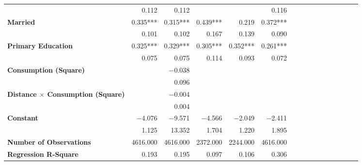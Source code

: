 \begin{tabular}{@{\extracolsep{5pt}}lrrrrrrrrrrrrrrr}
{\bf } & 0.112\phantom{\phantom{)}***} & 0.112\phantom{\phantom{)}***} & \phantom{***} & \phantom{***} & 0.116\phantom{\phantom{)}***} \\
{\bf Married} & 0.335\phantom{)}*** & 0.315\phantom{)}*** & 0.439\phantom{)}*** & 0.219\phantom{\phantom{)}***} & 0.372\phantom{)}*** \\
{\bf } & 0.101\phantom{\phantom{)}***} & 0.102\phantom{\phantom{)}***} & 0.167\phantom{\phantom{)}***} & 0.139\phantom{\phantom{)}***} & 0.090\phantom{\phantom{)}***} \\
{\bf Primary Education} & 0.325\phantom{)}*** & 0.329\phantom{)}*** & 0.305\phantom{)}*** & 0.352\phantom{)}*** & 0.261\phantom{)}*** \\
{\bf } & 0.075\phantom{\phantom{)}***} & 0.075\phantom{\phantom{)}***} & 0.114\phantom{\phantom{)}***} & 0.093\phantom{\phantom{)}***} & 0.072\phantom{\phantom{)}***} \\
{\bf Consumption (Square)} & \phantom{***} & $-$0.038\phantom{\phantom{)}***} & \phantom{***} & \phantom{***} & \phantom{***} \\
{\bf } & \phantom{***} & 0.096\phantom{\phantom{)}***} & \phantom{***} & \phantom{***} & \phantom{***} \\
{\bf Distance $\times$ Consumption (Square)} & \phantom{***} & $-$0.004\phantom{\phantom{)}***} & \phantom{***} & \phantom{***} & \phantom{***} \\
{\bf } & \phantom{***} & 0.004\phantom{\phantom{)}***} & \phantom{***} & \phantom{***} & \phantom{***} \\
{\bf Constant} & $-$4.076\phantom{\phantom{)}***} & $-$9.571\phantom{\phantom{)}***} & $-$4.566\phantom{\phantom{)}***} & $-$2.049\phantom{\phantom{)}***} & $-$2.411\phantom{\phantom{)}***} \\
{\bf } & 1.125\phantom{\phantom{)}***} & 13.352\phantom{\phantom{)}***} & 1.704\phantom{\phantom{)}***} & 1.220\phantom{\phantom{)}***} & 1.895\phantom{\phantom{)}***} \\
{\bf Number of Observations} & 4616.000\phantom{\phantom{)}***} & 4616.000\phantom{\phantom{)}***} & 2372.000\phantom{\phantom{)}***} & 2244.000\phantom{\phantom{)}***} & 4616.000\phantom{\phantom{)}***} \\
{\bf Regression R-Square} & 0.193\phantom{***} & 0.195\phantom{***} & 0.097\phantom{***} & 0.106\phantom{***} & 0.306\phantom{***} \\
\hline
\end{tabular}
